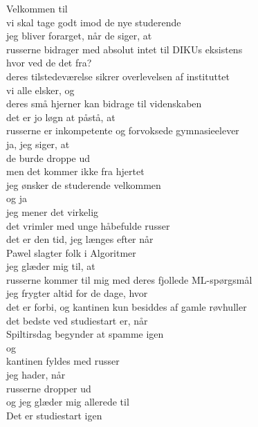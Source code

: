 \documentclass[a4paper,11pt]{article}
\begin{document}
\begin{sketch}

 Velkommen til\\
vi skal tage godt imod de nye studerende\\
jeg bliver forarget, når de siger, at\\
russerne bidrager med absolut intet til DIKUs eksistens\\
hvor ved de det fra?\\
deres tilstedeværelse sikrer overlevelsen af instituttet\\
vi alle elsker, og\\
deres små hjerner kan bidrage til videnskaben\\
det er jo løgn at påstå, at\\
russerne er inkompetente og forvoksede gymnasieelever\\
ja, jeg siger, at\\
de burde droppe ud\\
men det kommer ikke fra hjertet\\
jeg ønsker de studerende velkommen\\
og ja\\
jeg mener det virkelig\\
det vrimler med unge håbefulde russer\\
det er den tid, jeg længes efter når\\
Pawel slagter folk i Algoritmer\\
jeg glæder mig til, at\\
russerne kommer til mig med deres fjollede ML-spørgsmål\\
jeg frygter altid for de dage, hvor\\
det er forbi, og kantinen kun besiddes af gamle røvhuller\\
det bedste ved studiestart er, når\\
Spiltirsdag begynder at spamme igen\\
og\\
kantinen fyldes med russer\\
jeg hader, når\\
russerne dropper ud\\
og jeg glæder mig allerede til\\
Det er studiestart igen\\

\end{sketch}
\end{document}
